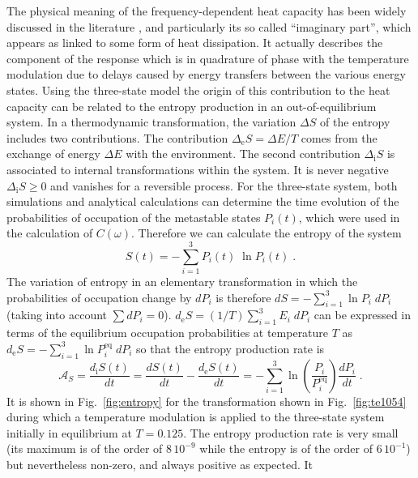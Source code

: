 \documentclass[pre,a4paper,twocolumn,superscriptaddress,%
floatfix]{revtex4}
\begin{document}
\smallskip
The physical meaning of the frequency-dependent heat capacity has been widely
discussed in the literature \cite{GARDEN-REVIEW}, and particularly its
so called ``imaginary part'', which appears as linked to some form of heat
dissipation. It actually describes the component of the response which is
in quadrature of phase with the temperature modulation due to delays caused
by energy transfers between the various energy states.
Using the three-state model the origin of this contribution to
the heat capacity can be related to the entropy production in an
out-of-equilibrium system. In a thermodynamic transformation, the variation
$\Delta S$ of the entropy includes two contributions. The contribution
$\Delta_{\mathrm{e}} S = \Delta E / T$
comes from the exchange of energy $\Delta E$ with
the environment. The second contribution $\Delta_{\mathrm{i}} S$ is associated to
internal transformations within the system. It is never negative
$\Delta_{\mathrm{i}} S \ge 0$ and vanishes for a reversible process.
For the three-state system, both simulations and analytical calculations can
determine the time evolution of the probabilities of occupation of the
metastable states $P_i(t)$, which were used in the calculation of
$C(\omega)$. Therefore we can calculate the entropy of the system
\begin{equation}
  \label{eq:entropy}
  S(t) = - \sum_{i=1}^3 P_i(t) \; \ln P_i(t) \; .
\end{equation}
The variation of entropy in an elementary transformation in which the
probabilities of occupation change by $dP_i$ is therefore
$dS = - \sum_{i=1}^3 \ln P_i \; dP_i$ (taking into account $\sum dP_i = 0$).
$d_{\mathrm{e}} S = (1/T)  \sum_{i=1}^3 E_i \; dP_i$ can be expressed in terms
of the equilibrium occupation probabilities at temperature $T$ as
$d_{\mathrm{e}} S = - \sum_{i=1}^3 \ln P^{\mathrm{eq}}_i \; dP_i$ so that the
entropy production rate is
\begin{equation}
  \label{eq:entropyprod}
  \mathcal{A}_S = \frac{d_{\mathrm{i}}S(t)}{dt} = \frac{dS(t)}{dt}
- \frac{d_{\mathrm{e}}S(t)}{dt} = - \sum_{i=1}^3 \ln \left(
\frac{P_i}{P^{\mathrm{eq}}_i} \right) \frac{dP_i}{dt} \; .
\end{equation}
It is shown in Fig.~\ref{fig:entropy} for the
transformation shown in Fig.~\ref{fig:te1054} during which a temperature
modulation is applied to the three-state system initially in
equilibrium at $T=0.125$. The entropy production rate is very
small (its maximum is of the order of $8 \, 10^{-9}$ while the entropy is of
the order of  
$6 \, 10^{-1}$) but nevertheless non-zero, and always positive as expected. It
\end{document}
